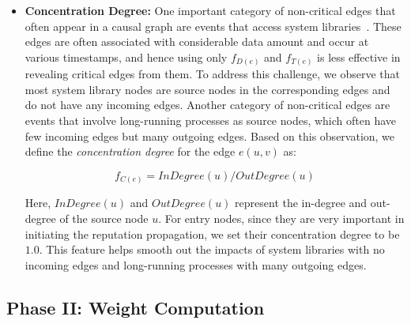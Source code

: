 \begin{itemize}[noitemsep, topsep=1pt, partopsep=1pt, listparindent=\parindent, leftmargin=*]


\item \textbf{Concentration Degree:}
One important category of non-critical edges that often appear in a causal graph are events that access system libraries~\cite{reduction,reduction2}. These edges are often associated with considerable data amount and occur at various timestamps, and hence using only $f_{D(e)}$  and $f_{T(e)}$ is less effective in revealing critical edges from them.
To address this challenge, we observe that most system library nodes are source nodes in the corresponding edges and do not have any incoming edges.
Another category of non-critical edges are events that involve long-running processes as source nodes, which often have few incoming edges but many outgoing edges.
Based on this observation, we define the \emph{concentration degree} for the edge $e(u, v)$ as:

\vspace*{-2ex}
\begin{equation}
    \label{eq:structure-feature}
    f_{C(e)} = InDegree(u)/OutDegree(u)
\end{equation}

Here, $InDegree(u)$ and $OutDegree(u)$ represent the in-degree and out-degree of the source node $u$.
For entry nodes, since they are very important in initiating the reputation propagation, we set their concentration degree to be $1.0$.
This feature helps smooth out the impacts of system libraries with no incoming edges and long-running processes with many outgoing edges.


\end{itemize}






\subsection{Phase II: Weight Computation}
\label{subsec:weight-computation}

